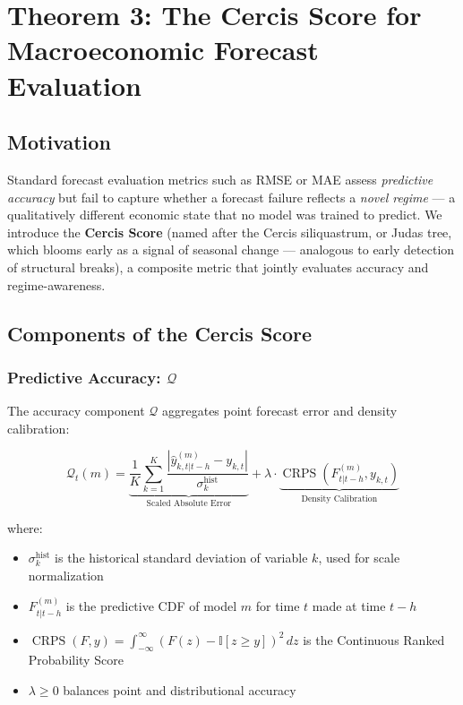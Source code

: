 \documentclass[12pt,a4paper]{article}
\DeclareMathOperator{\CRPS}{CRPS}
\begin{document}
\section{Theorem 3: The Cercis Score for Macroeconomic Forecast
Evaluation}
\label{sec:theorem3}

\subsection{Motivation}

Standard forecast evaluation metrics such as RMSE or MAE assess
\emph{predictive accuracy} but fail to capture whether a forecast
failure reflects a \emph{novel regime} --- a qualitatively different
economic state that no model was trained to predict.  We introduce
the \textbf{Cercis Score} (named after the Cercis siliquastrum, or
Judas tree, which blooms early as a signal of seasonal change ---
analogous to early detection of structural breaks), a composite
metric that jointly evaluates accuracy and regime-awareness.

\subsection{Components of the Cercis Score}

\subsubsection{Predictive Accuracy: $\mathcal{Q}$}

The accuracy component $\mathcal{Q}$ aggregates point forecast error
and density calibration:

\begin{equation}
    \mathcal{Q}_t(m) = \underbrace{\frac{1}{K} \sum_{k=1}^{K}
    \frac{|\hat{y}_{k,t|t-h}^{(m)} - y_{k,t}|}
    {\sigma_k^{\text{hist}}}}_{\text{Scaled Absolute Error}}
    + \lambda \cdot \underbrace{\CRPS\left(F_{t|t-h}^{(m)},
    y_{k,t}\right)}_{\text{Density Calibration}} \label{eq:q_component}
\end{equation}

where:
\begin{itemize}[leftmargin=*]
    \item $\sigma_k^{\text{hist}}$ is the historical standard deviation
    of variable $k$, used for scale normalization
    \item $F_{t|t-h}^{(m)}$ is the predictive CDF of model $m$ for
    time $t$ made at time $t-h$
    \item $\CRPS(F, y) = \int_{-\infty}^{\infty} (F(z) -
    \mathbb{I}[z \geq y])^2 \, dz$ is the Continuous Ranked
    Probability Score \citep{gneiting2007strictly}
    \item $\lambda \geq 0$ balances point and distributional accuracy
\end{itemize}
\end{document}
